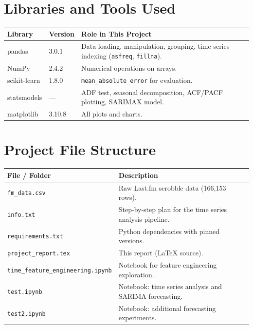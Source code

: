 \documentclass[12pt, a4paper]{article}
\begin{document}
\section{Libraries and Tools Used}

\begin{center}
\begin{tabular}{llp{7.5cm}}
    \toprule
    \textbf{Library} & \textbf{Version} & \textbf{Role in This Project} \\
    \midrule
    pandas          & 3.0.1  & Data loading, manipulation, grouping, time series indexing (\texttt{asfreq}, \texttt{fillna}). \\
    NumPy           & 2.4.2  & Numerical operations on arrays. \\
    scikit-learn    & 1.8.0  & \texttt{mean\_absolute\_error} for evaluation. \\
    statsmodels     & ---    & ADF test, seasonal decomposition, ACF/PACF plotting, SARIMAX model. \\
    matplotlib      & 3.10.8 & All plots and charts. \\
    \bottomrule
\end{tabular}
\end{center}

\section{Project File Structure}

\begin{center}
\begin{tabular}{lp{9cm}}
    \toprule
    \textbf{File / Folder} & \textbf{Description} \\
    \midrule
    \texttt{fm\_data.csv}                    & Raw Last.fm scrobble data (166{,}153 rows). \\
    \texttt{info.txt}                        & Step-by-step plan for the time series analysis pipeline. \\
    \texttt{requirements.txt}                & Python dependencies with pinned versions. \\
    \texttt{project\_report.tex}             & This report (LaTeX source). \\
    \texttt{time\_feature\_engineering.ipynb} & Notebook for feature engineering exploration. \\
    \texttt{test.ipynb}                      & Notebook: time series analysis and SARIMA forecasting. \\
    \texttt{test2.ipynb}                     & Notebook: additional forecasting experiments. \\
    \bottomrule
\end{tabular}
\end{center}
\end{document}
